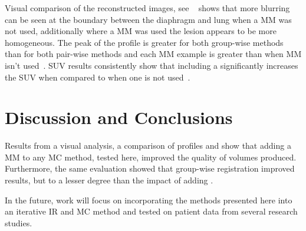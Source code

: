      Visual comparison of the reconstructed images, see ~ shows that more blurring can be seen at the boundary between the diaphragm and lung when  a \gls{MM} was not used, additionally where a \gls{MM} was used the lesion appears to be more homogeneous. The peak of the profile is greater for both group-wise methods than for both pair-wise methods and each \gls{MM} example is greater than when \gls{MM} isn't used~. \gls{SUV} results consistently show that including a  significantly increases the \gls{SUV} when compared to when one is not used~.

\vspace{-0.3cm}

\section{Discussion and Conclusions} \label{sec:discussion_and_conclusions}
    Results from a visual analysis, a comparison of profiles and  show that adding a \gls{MM} to any \gls{MC} method, tested here, improved the quality of volumes produced. Furthermore, the same evaluation showed that group-wise registration improved results, but to a lesser degree than the impact of adding .
    
    In the future, work will focus on incorporating the methods presented here into an iterative \gls{IR} and \gls{MC} method and tested on patient data from several research studies.
    